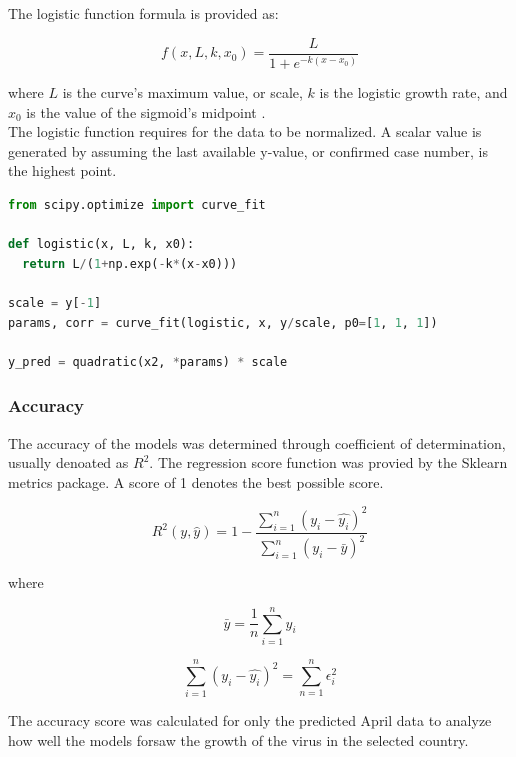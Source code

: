 \documentclass{homework}
\begin{document}
The logistic function formula is provided as:

\begin{equation}
  f(x, L, k, x_0) = \frac{L}{1+e^{-k(x-x_0)}}
\end{equation}

where $L$ is the curve's maximum value, or scale, $k$ is the logistic growth rate, and $x_0$ is the value of the sigmoid's midpoint \cite{albon_2018}.\\

The logistic function requires for the data to be normalized. A scalar value is generated by assuming the last available y-value, or confirmed case number, is the highest point.

\begin{lstlisting}[language=Python, caption={Logistic Model}]
from scipy.optimize import curve_fit
    
def logistic(x, L, k, x0):
  return L/(1+np.exp(-k*(x-x0)))
    
scale = y[-1]
params, corr = curve_fit(logistic, x, y/scale, p0=[1, 1, 1])
  
y_pred = quadratic(x2, *params) * scale
\end{lstlisting}

\subsubsection{Accuracy}

The accuracy of the models was determined through coefficient of determination, usually denoated as $R^2$. The regression score function was provied by the Sklearn metrics package. A score of 1 denotes the best possible score.


\begin{equation}
  R^2(y, \hat{y}) = 1-\frac{\sum_{i=1}^n(y_i - \hat{y_i})^2}{\sum_{i=1}^{n}(y_i - \bar{y})^2}
\end{equation}

where

\begin{equation*}
  \bar{y} = \frac{1}{n}\sum_{i=1}^{n} y_i
\end{equation*}

\begin{equation*}
  \sum_{i=1}^n(y_i - \hat{y_i})^2 = \sum_{n=1}^n \epsilon_i^2
\end{equation*}

The accuracy score was calculated for only the predicted April data to analyze how well the models forsaw the growth of the virus in the selected country.
\end{document}
